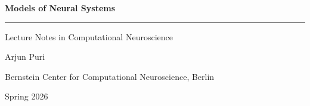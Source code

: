 \begin{titlepage}
  \centering
  \vspace*{3cm}

  {\sffamily\Huge\bfseries Models of Neural Systems}

  \vspace{0.6cm}
  {\rule{0.4\textwidth}{0.6pt}}

  \vspace{0.6cm}
  {\sffamily\Large Lecture Notes in Computational Neuroscience}

  \vspace{2.5cm}
  {\large Arjun Puri}

  \vspace{0.4cm}
  {\normalsize Bernstein Center for Computational Neuroscience, Berlin}

  \vfill

  {\small Spring 2026}

  \vspace{1cm}
\end{titlepage}
